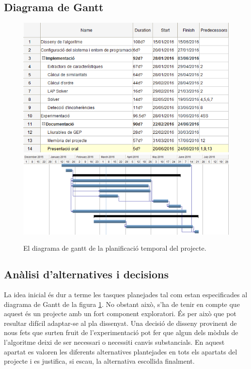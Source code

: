 \documentclass[10pt,a4paper]{article}
\begin{document}
\subsection{Diagrama de Gantt}
\label{gantt}

\begin{figure}[!htb]
    \centering
    \includegraphics[width=\textwidth]{gantt1.png}
    \includegraphics[width=\textwidth]{gantt2.png}
    \caption{El diagrama de gantt de la planificació temporal del projecte.}
    \label{fig:gantt}
\end{figure}

\subsection{Anàlisi d'alternatives i decisions}
\label{alternatives}

La idea inicial és dur a terme les tasques planejades tal com estan especificades al diagrama de Gantt de la figura \ref{fig:gantt}. No obstant això, s'ha de tenir en compte que aquest és un projecte amb un fort component exploratori. És per això que pot resultar difícil adaptar-se al pla dissenyat. Una decisió de disseny provinent de nous fets que surten fruit de l'experimentació pot fer que algun dels mòduls de l'algoritme deixi de ser necessari o necessiti canvis substancials. En aquest apartat es valoren les diferents alternatives plantejades en tots els apartats del projecte i es justifica, si escau, la alternativa escollida finalment.
\end{document}
